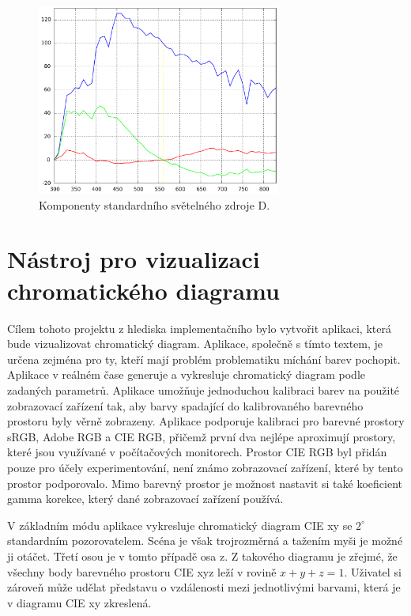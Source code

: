 \documentclass[a4paper, 12pt, titlepage]{article}
\begin{document}
  \begin{figure}[h!]
	\centering
	\includegraphics[width=8cm]{CIE_illuminants_D_components.pdf}
	\caption{Komponenty standardního světelného zdroje D.}
	\label{fig:CIE_illuminants_D_components}
	\end{figure}

  \section{Nástroj pro vizualizaci chromatického diagramu}
  Cílem tohoto projektu z hlediska implementačního bylo vytvořit aplikaci, která bude vizualizovat chromatický diagram.
  Aplikace, společně s tímto textem, je určena zejména pro ty, kteří mají problém problematiku míchání barev pochopit.
  Aplikace v reálném čase generuje a vykresluje chromatický diagram podle zadaných parametrů.
  Aplikace umožňuje jednoduchou kalibraci barev na použité zobrazovací zařízení tak, aby barvy spadající do kalibrovaného barevného prostoru byly věrně zobrazeny.
  Aplikace podporuje kalibraci pro barevné prostory sRGB, Adobe RGB a CIE RGB, přičemž první dva nejlépe aproximují prostory, které jsou využívané v počítačových monitorech.
  Prostor CIE RGB byl přidán pouze pro účely experimentování, není známo zobrazovací zařízení, které by tento prostor podporovalo.
  Mimo barevný prostor je možnost nastavit si také koeficient gamma korekce, který dané zobrazovací zařízení používá.

  V základním módu aplikace vykresluje chromatický diagram CIE xy se $2^\circ$ standardním pozorovatelem.
  Scéna je však trojrozměrná a tažením myši je možné ji otáčet.
  Třetí osou je v tomto případě osa z.
  Z takového diagramu je zřejmé, že všechny body barevného prostoru CIE xyz leží v rovině $x + y + z = 1$.
  Uživatel si zároveň může udělat představu o vzdálenosti mezi jednotlivými barvami, která je v diagramu CIE xy zkreslená.
\end{document}

